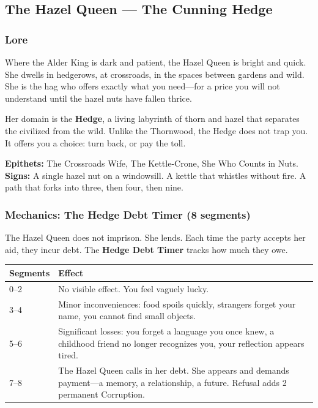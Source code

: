 \documentclass[11pt]{article}
\begin{document}
\subsection{The Hazel Queen --- The Cunning Hedge}

\subsubsection{Lore}

Where the Alder King is dark and patient, the Hazel Queen is bright and quick. She dwells in hedgerows, at crossroads, in the spaces between gardens and wild. She is the hag who offers exactly what you need---for a price you will not understand until the hazel nuts have fallen thrice.

Her domain is the \textbf{Hedge}, a living labyrinth of thorn and hazel that separates the civilized from the wild. Unlike the Thornwood, the Hedge does not trap you. It offers you a choice: turn back, or pay the toll.

\textbf{Epithets:} The Crossroads Wife, The Kettle-Crone, She Who Counts in Nuts.
\textbf{Signs:} A single hazel nut on a windowsill. A kettle that whistles without fire. A path that forks into three, then four, then nine.

\subsubsection{Mechanics: The Hedge Debt Timer (8 segments)}

The Hazel Queen does not imprison. She lends. Each time the party accepts her aid, they incur debt. The \textbf{Hedge Debt Timer} tracks how much they owe.

\begin{center}
\begin{longtable}{|p{3cm}|p{10cm}|}
\hline
\rowcolor{tableheader}
\textbf{Segments} & \textbf{Effect} \\
\hline
0--2 & No visible effect. You feel vaguely lucky. \\
\hline
3--4 & Minor inconveniences: food spoils quickly, strangers forget your name, you cannot find small objects. \\
\hline
5--6 & Significant losses: you forget a language you once knew, a childhood friend no longer recognizes you, your reflection appears tired. \\
\hline
7--8 & The Hazel Queen calls in her debt. She appears and demands payment---a memory, a relationship, a future. Refusal adds 2 permanent Corruption. \\
\hline
\end{longtable}
\end{center}
\end{document}
